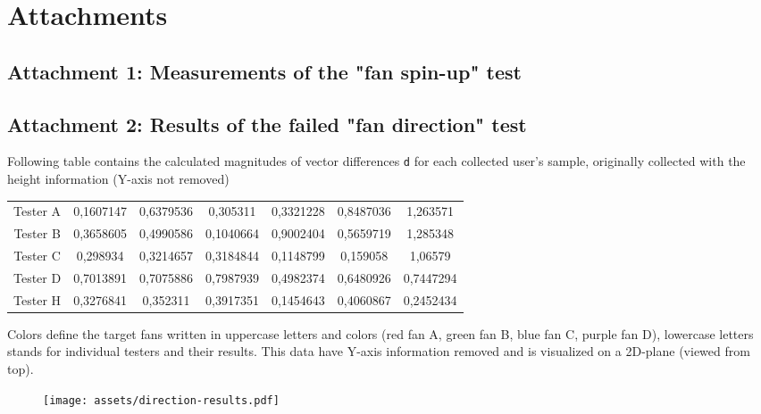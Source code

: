 \chapter{Attachments}

\hypertarget{x-attachment-1:-measurements-of-the-"fan-spin-up"-test}{\section*{Attachment 1: Measurements of the "fan spin-up" test}}

\hypertarget{x-attachment-2:-results-of-the-failed-"fan-direction"-test}{\section*{Attachment 2: Results of the failed "fan direction" test}}
Following table contains the calculated magnitudes of vector differences \texttt{d}
for each collected user’s sample, originally collected with the
height information (Y-axis not removed)


\begin{center}
\begin{tabular}{|c|c|c|c|c|c|c|}
\hline
Tester A & 0,1607147 & 0,6379536 & 0,305311 & 0,3321228 & 0,8487036 & 1,263571 \\ 
Tester B & 0,3658605 & 0,4990586 & 0,1040664 & 0,9002404 & 0,5659719 & 1,285348 \\ 
Tester C & 0,298934 & 0,3214657 & 0,3184844 & 0,1148799 & 0,159058 & 1,06579 \\ 
Tester D & 0,7013891 & 0,7075886 & 0,7987939 & 0,4982374 & 0,6480926 & 0,7447294 \\ 
Tester H & 0,3276841 & 0,352311 & 0,3917351 & 0,1454643 & 0,4060867 & 0,2452434 \\ 
\hline
\end{tabular}
\end{center}

Colors define the target fans written in uppercase letters and colors
(red fan A, green fan B, blue fan C, purple fan D),
lowercase letters stands for individual testers and their results. This data
have Y-axis information removed and is visualized on a 2D-plane
(viewed from top).


\begin{figure}[h]{}
\centering\texttt{[image: assets/direction-results.pdf]}
\caption{}

\end{figure}
